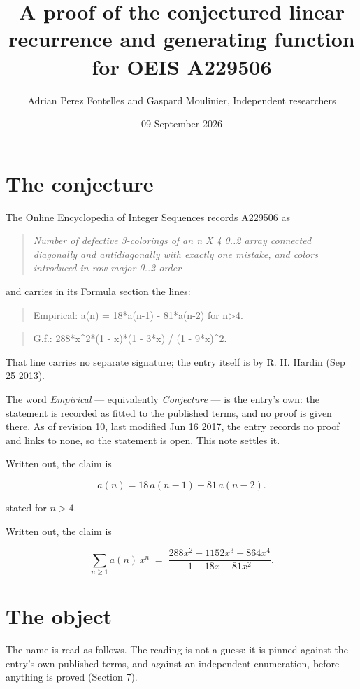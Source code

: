 \documentclass[11pt]{article}
\title{A proof of the conjectured linear recurrence and generating function for OEIS A229506}
\author{Adrian Perez Fontelles and Gaspard Moulinier, Independent researchers}
\date{09 September 2026}
\theoremstyle{definition}
\begin{document}
\maketitle
\section{The conjecture}

The Online Encyclopedia of Integer Sequences records \href{https://oeis.org/A229506}{A229506} as

\begin{quote}\itshape Number of defective 3-colorings of an n X 4 0..2 array connected diagonally and antidiagonally with exactly one mistake, and colors introduced in row-major 0..2 order\end{quote}

and carries in its Formula section the lines:

\begin{quote}\ttfamily Empirical: a(n) = 18*a(n-1) - 81*a(n-2) for n>4.\end{quote}

\begin{quote}\ttfamily G.f.: 288*x\textasciicircum{}2*(1 - x)*(1 - 3*x) / (1 - 9*x)\textasciicircum{}2.\end{quote}

That line carries no separate signature; the entry itself is by R. H. Hardin (Sep 25 2013).

The word {\itshape Empirical} --- equivalently {\itshape Conjecture} --- is the entry's own: the statement is recorded as fitted to the published terms, and no proof is given there. As of revision 10, last modified Jun 16 2017, the entry records no proof and links to none, so the statement is open. This note settles it.

Written out, the claim is

\[a(n) = 18\,a(n-1) - 81\,a(n-2).\]

stated for $n > 4$.

Written out, the claim is

\[\sum_{n \ge 1} a(n)\,x^n \;=\; \frac{288x^{2} - 1152x^{3} + 864x^{4}}{1 - 18x + 81x^{2}}.\]

\section{The object}

The name is read as follows. The reading is not a guess: it is pinned against the entry's own published terms, and against an independent enumeration, before anything is proved (Section 7).
\end{document}
